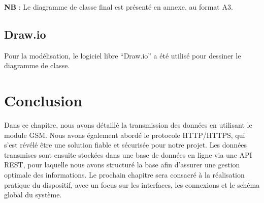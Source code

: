 \textbf{NB} : Le diagramme de classe final est présenté en annexe, au format A3.








\subsection{Draw.io}

Pour la modélisation, le logiciel libre ``Draw.io'' a été utilisé pour dessiner le diagramme de classe.

\section{Conclusion}

Dans ce chapitre, nous avons détaillé la transmission des données en utilisant le module GSM. Nous avons également abordé le protocole HTTP/HTTPS, qui s'est révélé être une solution fiable et sécurisée pour notre projet. Les données transmises sont ensuite stockées dans une base de données en ligne via une API REST, pour laquelle nous avons structuré la base afin d'assurer une gestion optimale des informations. Le prochain chapitre sera consacré à la réalisation pratique du dispositif, avec un focus sur les interfaces, les connexions et le schéma global du système.
